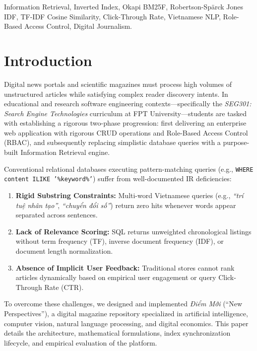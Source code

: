\documentclass[conference]{IEEEtran}
\begin{document}
\begin{IEEEkeywords}
Information Retrieval, Inverted Index, Okapi BM25F, Robertson-Spärck Jones IDF, TF-IDF Cosine Similarity, Click-Through Rate, Vietnamese NLP, Role-Based Access Control, Digital Journalism.
\end{IEEEkeywords}

\section{Introduction}
Digital news portals and scientific magazines must process high volumes of unstructured articles while satisfying complex reader discovery intents. In educational and research software engineering contexts---specifically the \textit{SEG301: Search Engine Technologies} curriculum at FPT University---students are tasked with establishing a rigorous two-phase progression: first delivering an enterprise web application with rigorous CRUD operations and Role-Based Access Control (RBAC), and subsequently replacing simplistic database queries with a purpose-built Information Retrieval engine.

Conventional relational databases executing pattern-matching queries (e.g., \texttt{WHERE content ILIKE '\%keyword\%'}) suffer from well-documented IR deficiencies:
\begin{enumerate}
    \item \textbf{Rigid Substring Constraints:} Multi-word Vietnamese queries (e.g., \textit{``trí tuệ nhân tạo''}, \textit{``chuyển đổi số''}) return zero hits whenever words appear separated across sentences.
    \item \textbf{Lack of Relevance Scoring:} SQL returns unweighted chronological listings without term frequency (TF), inverse document frequency (IDF), or document length normalization.
    \item \textbf{Absence of Implicit User Feedback:} Traditional stores cannot rank articles dynamically based on empirical user engagement or query Click-Through Rate (CTR).
\end{enumerate}

To overcome these challenges, we designed and implemented \textit{Điểm Mới} (``New Perspectives''), a digital magazine repository specialized in artificial intelligence, computer vision, natural language processing, and digital economics. This paper details the architecture, mathematical formulations, index synchronization lifecycle, and empirical evaluation of the platform.
\end{document}

